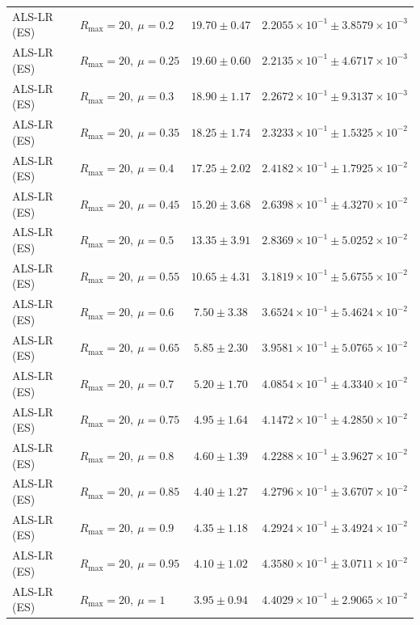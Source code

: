 \begin{table}[t]
\begin{tabular}{@{}llcc@{}}
ALS-LR (ES) & \(R_{\max}=20,\ \mu=0.2\) & \(19.70 \pm 0.47\) & \(2.2055{\times}10^{-1} \pm 3.8579{\times}10^{-3}\) \\
ALS-LR (ES) & \(R_{\max}=20,\ \mu=0.25\) & \(19.60 \pm 0.60\) & \(2.2135{\times}10^{-1} \pm 4.6717{\times}10^{-3}\) \\
ALS-LR (ES) & \(R_{\max}=20,\ \mu=0.3\) & \(18.90 \pm 1.17\) & \(2.2672{\times}10^{-1} \pm 9.3137{\times}10^{-3}\) \\
ALS-LR (ES) & \(R_{\max}=20,\ \mu=0.35\) & \(18.25 \pm 1.74\) & \(2.3233{\times}10^{-1} \pm 1.5325{\times}10^{-2}\) \\
ALS-LR (ES) & \(R_{\max}=20,\ \mu=0.4\) & \(17.25 \pm 2.02\) & \(2.4182{\times}10^{-1} \pm 1.7925{\times}10^{-2}\) \\
ALS-LR (ES) & \(R_{\max}=20,\ \mu=0.45\) & \(15.20 \pm 3.68\) & \(2.6398{\times}10^{-1} \pm 4.3270{\times}10^{-2}\) \\
ALS-LR (ES) & \(R_{\max}=20,\ \mu=0.5\) & \(13.35 \pm 3.91\) & \(2.8369{\times}10^{-1} \pm 5.0252{\times}10^{-2}\) \\
ALS-LR (ES) & \(R_{\max}=20,\ \mu=0.55\) & \(10.65 \pm 4.31\) & \(3.1819{\times}10^{-1} \pm 5.6755{\times}10^{-2}\) \\
ALS-LR (ES) & \(R_{\max}=20,\ \mu=0.6\) & \(7.50 \pm 3.38\) & \(3.6524{\times}10^{-1} \pm 5.4624{\times}10^{-2}\) \\
ALS-LR (ES) & \(R_{\max}=20,\ \mu=0.65\) & \(5.85 \pm 2.30\) & \(3.9581{\times}10^{-1} \pm 5.0765{\times}10^{-2}\) \\
ALS-LR (ES) & \(R_{\max}=20,\ \mu=0.7\) & \(5.20 \pm 1.70\) & \(4.0854{\times}10^{-1} \pm 4.3340{\times}10^{-2}\) \\
ALS-LR (ES) & \(R_{\max}=20,\ \mu=0.75\) & \(4.95 \pm 1.64\) & \(4.1472{\times}10^{-1} \pm 4.2850{\times}10^{-2}\) \\
ALS-LR (ES) & \(R_{\max}=20,\ \mu=0.8\) & \(4.60 \pm 1.39\) & \(4.2288{\times}10^{-1} \pm 3.9627{\times}10^{-2}\) \\
ALS-LR (ES) & \(R_{\max}=20,\ \mu=0.85\) & \(4.40 \pm 1.27\) & \(4.2796{\times}10^{-1} \pm 3.6707{\times}10^{-2}\) \\
ALS-LR (ES) & \(R_{\max}=20,\ \mu=0.9\) & \(4.35 \pm 1.18\) & \(4.2924{\times}10^{-1} \pm 3.4924{\times}10^{-2}\) \\
ALS-LR (ES) & \(R_{\max}=20,\ \mu=0.95\) & \(4.10 \pm 1.02\) & \(4.3580{\times}10^{-1} \pm 3.0711{\times}10^{-2}\) \\
ALS-LR (ES) & \(R_{\max}=20,\ \mu=1\) & \(3.95 \pm 0.94\) & \(4.4029{\times}10^{-1} \pm 2.9065{\times}10^{-2}\) \\

\end{tabular}
\end{table}
